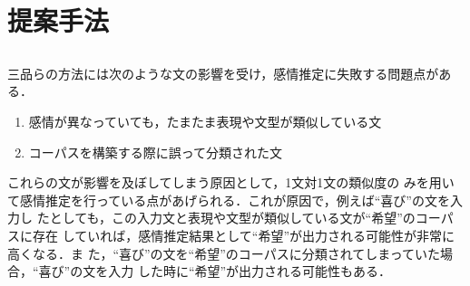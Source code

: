 \documentclass[japanese]{jnlp_1.4}
\def\resp#1{}
\def\respeqn#1{}
\def\freq#1#2{}
\def\ngram{}
\begin{document}
\section{提案手法}
\label{sec:proposed_method}

\subsection{\respeqn{コーパスごとの出現回数を考慮したペナルティ}}

三品らの方法には次のような文の影響を受け，感情推定に失敗する問題点がある．
\begin{enumerate}
 \item 感情が異なっていても，たまたま表現や文型が類似している文
 \item コーパスを構築する際に誤って分類された文
\end{enumerate}
これらの文が影響を及ぼしてしまう原因として，1文対1文の類似度の
みを用いて感情推定を行っている点があげられる．これが原因で，例えば``喜び''の文を入力し
たとしても，この入力文と表現や文型が類似している文が``希望''のコーパスに存在
していれば，感情推定結果として``希望''が出力される可能性が非常に高くなる．ま
た，``喜び''の文を``希望''のコーパスに分類されてしまっていた場合，``喜び''の文を入力
した時に``希望''が出力される可能性もある．

\resp{この問題を解決するために，形態素N-gram適合率に対して新たなペナルティFPを
導入する．
FPは入力文の形態素列が各感情コーパスにどの程度偏って存在す
るかを表す指標であり，各感情コーパス中の出現頻度から計算される．
この指標を用いる理由は，入力文に含まれ
る形態素列が，他の感情コーパスに比べて相対的に数多く出現している
感情コーパスの感情を，入力文は表現している可能性が
高いのではないか，と考えたためである．入力文{$x$}において，
感情{$e$}に対するFPを次のとおりに定義する．
}
\begin{equation}
\respeqn{
 {\rm FP}_{n} =
  \frac{1}{\left|G_{n}(x)\right|}\sum_{\ngram \in
  G_{n}(x)}{\frac{\freq{C_{e}}{\ngram}}{\displaystyle \sum_{c \in
  C}{\freq{c}{\ngram}}}} \label{eq:wn} }
\end{equation}
\resp{
ここで{$C$}をすべ
ての感情コーパス，{${freq_{\it C_{e}}}$}を感情コーパス{$C_{e}$}における{$\ngram$}の
出現回数を返す関数とする．
FPは，たまたま1文対1文の類似度が高かったとしても，類似度計算
に用いている文を含むコーパスにおいて入力文の形態素列の出現回数が少なけれ
ば，求められる類似度を低く押さえる効果を持つ．これにより，(1)と(2)の文に
よる影響を改善する．}

\resp{一般に，一部の文書に偏って存在している単語を表す指標として，TF-IDFがよく
用いられている．その意味では，FPのかわりにTF-IDFを用いる方法が考えられる．
しかしTF-IDFは，ある感情コーパス中の絶対的な出現頻度（{\it tf}値）を，
他の感情コーパスにも出現しているかどうか，という形態素N-gramの一般性を
示す値（{\it idf}値）を用いて修正したものであり，ある感情コーパス
中での出現頻度が低い形態素N-gramであれば，たとえその感情コーパスに
偏って存在していたとしても，その値は低いものとなる．そのため，TF-IDF
を類似度計算に導入したとしても，FPよりその効果は薄いものとなることが
予想される．}
\end{document}
